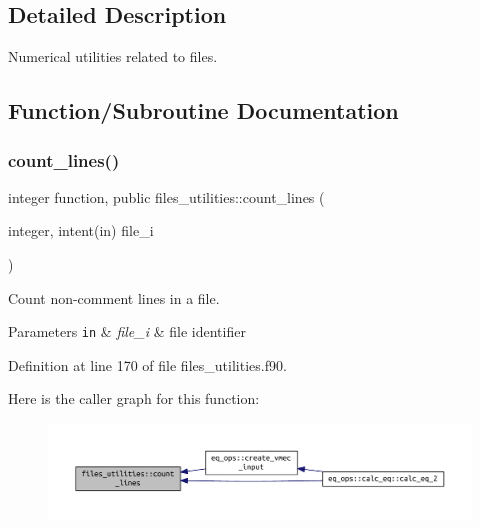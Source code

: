 \subsection{Detailed Description}
Numerical utilities related to files. 

\subsection{Function/\+Subroutine Documentation}
\mbox{\label{namespacefiles__utilities_a3ec80c9937d23aba0d8da951ea292a83}} 
\subsubsection{\texorpdfstring{count\+\_\+lines()}{count\_lines()}}
{\footnotesize\ttfamily integer function, public files\+\_\+utilities\+::count\+\_\+lines (\begin{DoxyParamCaption}\item[{integer, intent(in)}]{file\+\_\+i }\end{DoxyParamCaption})}



Count non-\/comment lines in a file. 


\begin{DoxyParams}[1]{Parameters}
\mbox{\tt in}  & {\em file\+\_\+i} & file identifier \\
\hline
\end{DoxyParams}


Definition at line 170 of file files\+\_\+utilities.\+f90.

Here is the caller graph for this function\+:
\nopagebreak
\begin{figure}[H]
\begin{center}
\leavevmode
\includegraphics[width=350pt]{namespacefiles__utilities_a3ec80c9937d23aba0d8da951ea292a83_icgraph}
\end{center}
\end{figure}
\mbox{\label{namespacefiles__utilities_a083c08dfd3919fa2a1df01507fe431af}} 
